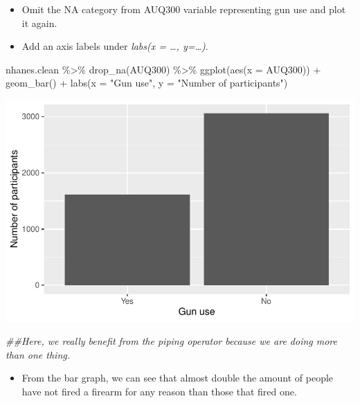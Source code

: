\documentclass[
  letterpaper,
  DIV=11,
  numbers=noendperiod]{scrreprt}
\newenvironment{Shaded}{\begin{snugshade}}{\end{snugshade}}
\newcommand{\AttributeTok}[1]{\textcolor[rgb]{0.40,0.45,0.13}{#1}}
\newcommand{\DocumentationTok}[1]{\textcolor[rgb]{0.37,0.37,0.37}{\textit{#1}}}
\newcommand{\FunctionTok}[1]{\textcolor[rgb]{0.28,0.35,0.67}{#1}}
\newcommand{\NormalTok}[1]{\textcolor[rgb]{0.00,0.23,0.31}{#1}}
\newcommand{\SpecialCharTok}[1]{\textcolor[rgb]{0.37,0.37,0.37}{#1}}
\newcommand{\StringTok}[1]{\textcolor[rgb]{0.13,0.47,0.30}{#1}}
\providecommand{\tightlist}{%
  \setlength{\itemsep}{0pt}\setlength{\parskip}{0pt}}\usepackage{longtable,booktabs,array}
\begin{document}
\begin{itemize}
\tightlist
\item
  Omit the NA category from AUQ300 variable representing gun use and
  plot it again.
\item
  Add an axis labels under \emph{labs(x = \ldots, y=\ldots)}.
\end{itemize}

\begin{Shaded}
\begin{Highlighting}[]
\NormalTok{nhanes.clean }\SpecialCharTok{\%\textgreater{}\%}
  \FunctionTok{drop\_na}\NormalTok{(AUQ300) }\SpecialCharTok{\%\textgreater{}\%}
  \FunctionTok{ggplot}\NormalTok{(}\FunctionTok{aes}\NormalTok{(}\AttributeTok{x =}\NormalTok{ AUQ300)) }\SpecialCharTok{+} \FunctionTok{geom\_bar}\NormalTok{() }\SpecialCharTok{+}
  \FunctionTok{labs}\NormalTok{(}\AttributeTok{x =} \StringTok{"Gun use"}\NormalTok{, }\AttributeTok{y =} \StringTok{"Number of participants"}\NormalTok{)}
\end{Highlighting}
\end{Shaded}

\includegraphics{dataviz_files/figure-pdf/unnamed-chunk-12-1.pdf}

\begin{Shaded}
\begin{Highlighting}[]
\DocumentationTok{\#\#Here, we really benefit from the piping operator because we are doing more than one thing.}
\end{Highlighting}
\end{Shaded}

\begin{itemize}
\tightlist
\item
  From the bar graph, we can see that almost double the amount of people
  have not fired a firearm for any reason than those that fired one.
\end{itemize}
\end{document}
